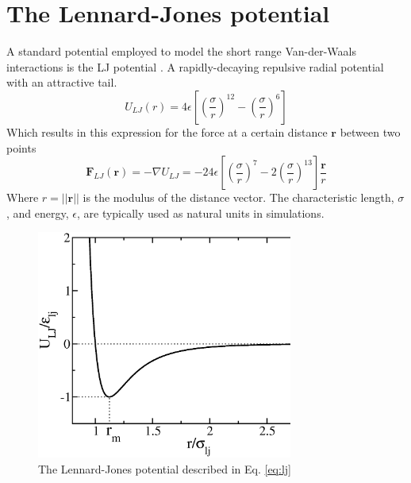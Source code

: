 \documentclass[twoside,openright,titlepage,numbers=noenddot,%
headinclude,footinclude,cleardoublepage=empty,abstract=on,
BCOR=5mm,fontsize=11pt, dvipsnames, paper=b5
]{scrreprt}
\renewcommand{\vec}[1]{\bm{#1}}
\begin{document}
\section{The Lennard-Jones potential}\label{sec:lj}
A standard potential employed to model the short range Van-der-Waals interactions is the \gls{LJ} potential \cite{Thol2015}. A rapidly-decaying repulsive radial potential with an attractive tail.
\begin{equation}
  \label{eq:lj}
  U_{LJ}(r) = 4 \epsilon \left[ \left(\frac{\sigma}{r}\right)^{12} - \left( \frac{\sigma}{r}\right)^6 \right] 
\end{equation}
Which results in this expression for the force at a certain distance $\vec{r}$ between two points
\begin{equation}
  \label{eq:ljf}
  \vec{F}_{LJ}(\vec{r}) = -\nabla U_{LJ} = -24 \epsilon \left[ \left(\frac{\sigma}{r}\right)^{7} - 2\left( \frac{\sigma}{r}\right)^{13} \right] \frac{\vec{r}}{r}
\end{equation}
Where $r = ||\vec{r}||$ is the modulus of the distance vector. The characteristic length, $\sigma$, and energy, $\epsilon$, are typically used as natural units in simulations.
\begin{figure}
  \centering
  \includegraphics[width=0.75\textwidth]{lj}
  \caption[ ]{The Lennard-Jones potential described in Eq. \ref{eq:lj}}
  \label{fig:lj}
\end{figure}
\end{document}
